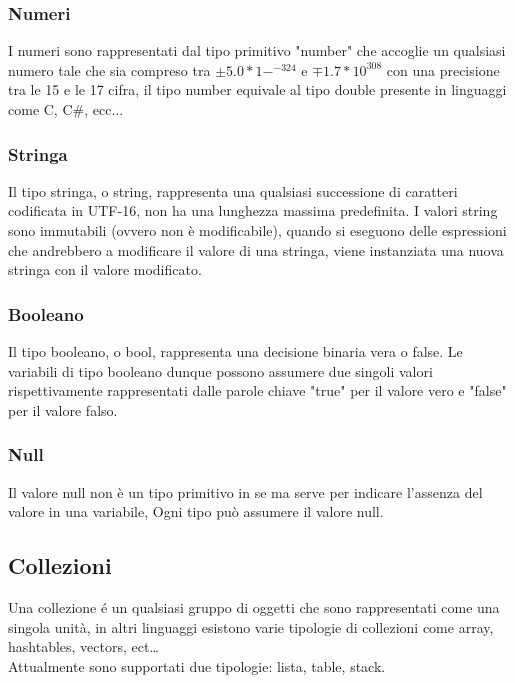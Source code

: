 \subsubsection{Numeri}
I numeri sono rappresentati dal tipo primitivo "number" che accoglie un qualsiasi numero tale che
sia compreso tra \( \pm5.0*1-^{-324} \) e \(\mp 1.7*10^308\) con una precisione tra le 15 e le 17
cifra, il tipo number equivale al tipo double presente in linguaggi come C, C\#, ecc...

\subsubsection{Stringa}
Il tipo stringa, o string, rappresenta una qualsiasi successione di caratteri codificata in UTF-16, 
non ha una lunghezza massima predefinita.
I valori string sono immutabili (ovvero non è modificabile), quando si eseguono delle espressioni
che andrebbero a modificare il valore di una stringa, viene instanziata una nuova stringa con il valore
modificato.

\subsubsection{Booleano}
Il tipo booleano, o bool, rappresenta una decisione binaria vera o false.
Le variabili di tipo booleano dunque possono assumere due singoli valori rispettivamente 
rappresentati dalle parole chiave "true" per il valore vero e "false" per il valore falso.

\subsubsection{Null}
Il valore null non è un tipo primitivo in se ma serve per indicare l'assenza del valore in una variabile,
Ogni tipo può assumere il valore null.

\subsection{Collezioni}
Una collezione é un qualsiasi gruppo di oggetti che sono rappresentati come una singola unità,
in altri linguaggi esistono varie tipologie di collezioni come array, hashtables, vectors, ect\dots \\
Attualmente sono supportati due tipologie: lista, table, stack.

